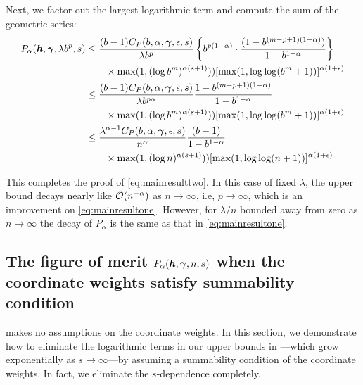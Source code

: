 \documentclass[authoryear]{elsarticle}
\begin{document}
Next, we factor out the largest logarithmic term and compute the sum of the geometric series: 
\begin{align*}
     P_\alpha(\boldsymbol{h},\boldsymbol{\gamma},\lambda b^p,s)
     & \le \frac { (b-1) C_{P}(b,\alpha, \boldsymbol{\gamma}, \epsilon,s)}{\lambda b^p} \left\{ b^{p(1-\alpha)} \cdot \frac{(1 - b^{(m-p+1)(1- \alpha )})}{1 - b^{1- \alpha}}\right\} \\
    & \qquad  \times \max(1, (\log b^{m})^{\alpha(s+1)})) [\max(1,\log \log (
    b^m+1))]^{\alpha(1+\epsilon)} \\
    &\leq  \frac {(b-1)C_{P}(b,\alpha, \boldsymbol{\gamma}, \epsilon,s)}{\lambda b^{p\alpha}}  \frac{1 - b^{(m-p+1)(1- \alpha )}}{1 - b^{1- \alpha}} \\
    &\qquad \times \max(1, (\log b^{m})^{\alpha(s+1)})) [\max(1,\log \log (
    b^m+1))]^{\alpha(1+\epsilon)} \\
    &\le \frac{\lambda^{\alpha -1}{C}_{P}(b,\alpha, \boldsymbol{\gamma},\epsilon,s)}{n^{\alpha}}  \frac {(b-1)} {1 - b^{1- \alpha}} \\
    &\qquad \times \max(1, (\log n )^{\alpha(s+1)})) [\max(1,\log \log (
    n+1))]^{\alpha(1+\epsilon)}   
\end{align*}

This completes the proof of \eqref{eq:mainresulttwo}. In this case of fixed $\lambda$, the upper bound decays nearly like $\operatorname{{\mathcal O}}(n^{- \alpha})$ as $n \rightarrow \infty$, i.e, $p \to \infty$,  
which is an improvement on \eqref{eq:mainresultone}. However, for $\lambda/n$ bounded away from zero as $n \to \infty$ the decay of $P_\alpha$ is the same as that in \eqref{eq:mainresultone}.


\subsection{The figure of merit $P_{\alpha}(\vh,\vgamma,\lowercase{n},s)$ when the coordinate weights satisfy summability condition }

 makes no assumptions on the coordinate weights. In this section, we demonstrate how to eliminate the logarithmic terms in our upper bounds in ---which grow exponentially as $s \to \infty$---by assuming a summability condition of the coordinate weights. In fact, we eliminate the $s$-dependence completely.
\end{document}
